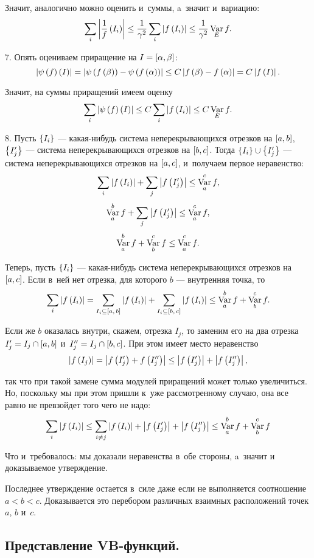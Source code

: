 \documentclass[draft]{article}
\begin{document}
Значит, аналогично можно оценить и~суммы, a~значит и~вариацию:
$$\sumi\abs{{1\over
f}\at(I_i)}\le{1\over\gamma^2}\sumi\abs{f\at(I_i)}\le{1\over\gamma^2}\var_Ef.$$

\eject

7. Опять оцениваем приращение на $I=\seg[\alpha,\beta]$:
$$\abs{\psi\at(f)\at(I)}=\abs{\psi\at({f\at(\beta)})-\psi\at({f\at(\alpha)})}
\le C\abs{f\at(\beta)-f\at(\alpha)}=C\abs{f\at(I)}.$$

Значит, на суммы приращений имеем оценку
$$\sumi\abs{\psi\at(f)\at(I)}\le C\sumi\abs{f\at(I_i)}\le C\var_Ef.$$

8. Пусть $\left\{I_i\right\}$ --- какая-нибудь система неперекрывающихся
отрезков на $\seg[a,b]$, $\left\{I'_j\right\}$ --- система неперекрывающихся
отрезков на $\seg[b,c]$. Тогда $\left\{I_i\right\}\cup\left\{I'_j\right\}$ --- система
неперекрывающихся отрезков на $\seg[a,c]$, и~получаем первое
неравенство:
$$\sumi\abs{f\at(I_i)}+\sumj\abs{f\at(I'_j)}\le\var_a^cf,$$
$$\var_a^bf+\sumj\abs{f\at(I'_j)}\le\var_a^cf,$$
$$\mathop{\mathrm{Var}}\limits_a^bf+\mathop{\mathrm{Var}}\limits_b^cf\le\mathop{\mathrm{Var}}\limits_a^cf.$$

Теперь, пусть $\left\{I_i\right\}$ --- какая-нибудь система неперекрывающихся
отрезков на $\seg[a,c]$. Если в~ней нет отрезка, для которого $b$
--- внутренняя точка, то
$$\sumi\abs{f\at(I_i)}=    \sum_{I_i\subseteq\seg[a ,\,b]}   \abs{f\at(I_i)}+
    \sum_{I_i\subseteq\seg[b ,\,c]}   \abs{f\at(I_i)}\le\var_a^bf+\var_b^cf.$$

Если же $b$ оказалась внутри, скажем, отрезка $I_j$, то заменим его
на два отрезка $I'_j=I_j\cap\seg[a,b]$ и~$I''_j=I_j\cap\seg[b,c]$.
При этом имеет место неравенство
$$\abs{f\at(I_j)}=\abs{f\at(I'_j)+f\at(I''_j)}\le\abs{f\at(I'_j)}+\abs{f\at(I''_j)},$$

так что при такой замене сумма модулей приращений может только
увеличиться. Но, поскольку мы при этом пришли к~уже рассмотренному
случаю, она все равно не превзойдет того чего не надо:
$$\sumi\abs{f\at(I_i)}\le\sum_{i\neq
j}\abs{f\at(I_i)}+\abs{f\at(I'_j)}+\abs{f\at(I''_j)}\le\var_a^bf+\var_b^cf$$

Что и~требовалось: мы доказали неравенства в~обе стороны, a~значит и
доказываемое утверждение.

\pruts

\bigskip

{\small \rem

Последнее утверждение остается в~силе даже если не выполняется
соотношение $a<b<c$. Доказывается это перебором различных взаимных
расположений точек $a$, $b$ и~$c$.}

\subsection{Представление VB-функций.}
\end{document}
